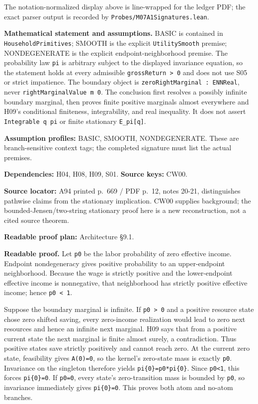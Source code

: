 \documentclass[
  11pt,
]{article}
\let\LedgerOriginalTexttt\texttt
\renewcommand{\texttt}[1]{{\small\LedgerOriginalTexttt{#1}}}
\begin{document}
The notation-normalized display above is line-wrapped for the ledger
PDF; the exact parser output is recorded by
\texttt{Probes/M07A1Signatures.lean}.

\textbf{Mathematical statement and assumptions.} BASIC is contained in
\texttt{HouseholdPrimitives}; SMOOTH is the explicit
\texttt{UtilitySmooth} premise; NONDEGENERATE is the explicit
endpoint-neighborhood premise. The probability law \texttt{pi} is
arbitrary subject to the displayed invariance equation, so the statement
holds at every admissible \texttt{grossReturn\ \textgreater{}\ 0} and
does not use S05 or strict impatience. The boundary object is
\texttt{zeroRightMarginal\ :\ ENNReal}, never
\texttt{rightMarginalValue\ m\ 0}. The conclusion first resolves a
possibly infinite boundary marginal, then proves finite positive
marginals almost everywhere and H09's conditional finiteness,
integrability, and real inequality. It does not assert
\texttt{Integrable\ q\ pi} or finite stationary \texttt{E\_pi{[}q{]}}.

\textbf{Assumption profiles:} BASIC, SMOOTH, NONDEGENERATE. These are
branch-sensitive context tags; the completed signature must list the
actual premises.

\textbf{Dependencies:} H04, H08, H09, S01. \textbf{Source keys:} CW00.

\textbf{Source locator:} A94 printed p.~669 / PDF p.~12, notes 20-21,
distinguishes pathwise claims from the stationary implication. CW00
supplies background; the bounded-Jensen/two-string stationary proof here
is a new reconstruction, not a cited source theorem.

\textbf{Readable proof plan:} Architecture §9.1.

\textbf{Readable proof.} Let \texttt{p0} be the labor probability of
zero effective income. Endpoint nondegeneracy gives positive probability
to an upper-endpoint neighborhood. Because the wage is strictly positive
and the lower-endpoint effective income is nonnegative, that
neighborhood has strictly positive effective income; hence
\texttt{p0\ \textless{}\ 1}.

Suppose the boundary marginal is infinite. If
\texttt{p0\ \textgreater{}\ 0} and a positive resource state chose zero
shifted saving, every zero-income realization would lead to zero next
resources and hence an infinite next marginal. H09 says that from a
positive current state the next marginal is finite almost surely, a
contradiction. Thus positive states save strictly positively and cannot
reach zero. At the current zero state, feasibility gives
\texttt{A(0)=0}, so the kernel's zero-state mass is exactly \texttt{p0}.
Invariance on the singleton therefore yields
\texttt{pi\{0\}=p0*pi\{0\}}. Since \texttt{p0\textless{}1}, this forces
\texttt{pi\{0\}=0}. If \texttt{p0=0}, every state's zero-transition mass
is bounded by \texttt{p0}, so invariance immediately gives
\texttt{pi\{0\}=0}. This proves both atom and no-atom branches.
\end{document}
